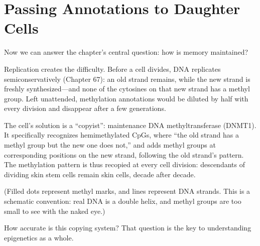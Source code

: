 \section{Passing Annotations to Daughter Cells}

Now we can answer the chapter's central question: how is memory maintained?

Replication creates the difficulty. Before a cell divides, DNA replicates semiconservatively (Chapter 67): an old strand remains, while the new strand is freshly synthesized---and none of the cytosines on that new strand has a methyl group. Left unattended, methylation annotations would be diluted by half with every division and disappear after a few generations.

The cell's solution is a ``copyist'': maintenance DNA methyltransferase (DNMT1). It specifically recognizes hemimethylated CpGs, where ``the old strand has a methyl group but the new one does not,'' and adds methyl groups at corresponding positions on the new strand, following the old strand's pattern. The methylation pattern is thus recopied at every cell division: descendants of dividing skin stem cells remain skin cells, decade after decade.


(Filled dots represent methyl marks, and lines represent DNA strands. This is a schematic convention: real DNA is a double helix, and methyl groups are too small to see with the naked eye.)

How accurate is this copying system? That question is the key to understanding epigenetics as a whole.

